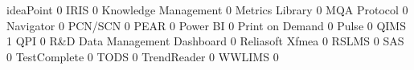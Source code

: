 \documentclass{article}
\begin{document}
\begin{Schunk}
\begin{Soutput}
  ideaPoint                                                                       0
  IRIS                                                                            0
  Knowledge Management                                                            0
  Metrics Library                                                                 0
  MQA Protocol                                                                    0
  Navigator                                                                       0
  PCN/SCN                                                                         0
  PEAR                                                                            0
  Power BI                                                                        0
  Print on Demand                                                                 0
  Pulse                                                                           0
  QIMS                                                                            1
  QPI                                                                             0
  R&D Data Management Dashboard                                                   0
  Reliasoft Xfmea                                                                 0
  RSLMS                                                                           0
  SAS                                                                             0
  TestComplete                                                                    0
  TODS                                                                            0
  TrendReader                                                                     0
  WWLIMS                                                                          0
                                                           

\end{Soutput}
\end{Schunk}
\end{document}

